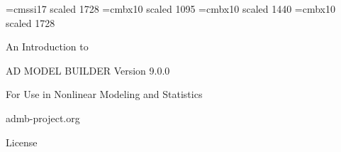 %
%
%
\font\halfinch=cmssi17 scaled 1728
\font\smallheadfont=cmbx10 scaled 1095
\font\largeheadfont=cmbx10 scaled 1440
\font\hugeheadfont=cmbx10 scaled 1728


\vspace*{2in}
{\hugeheadfont
\centerline{An Introduction to}
\vspace{0.25in}
\centerline{{\halfinch AD MODEL BUILDER Version 9.0.0}}
\vspace{0.25in}
\centerline{For Use in Nonlinear Modeling and Statistics}}

\vspace{0.5in}
\centerline{admb-project.org}

\vfill
\eject

\centerline{\LARGE License}


\newpage

